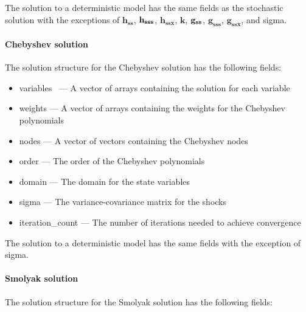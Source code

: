 \documentclass[notitlepage,11pt]{article}
\begin{document}
The solution to a deterministic model has the same fields as the stochastic
solution with the exceptions of $\mathbf{h}_{\mathbf{ss}}$, $\mathbf{h}_{%
\mathbf{sss}}$, $\mathbf{h}_{\mathbf{ssx}}$, $\mathbf{k}$, $\mathbf{g}_{%
\mathbf{ss}}$, $\mathbf{g}_{\mathbf{sss}}$, $\mathbf{g}_{\mathbf{ssx}}$, and
sigma.

\paragraph{Chebyshev solution}

The solution structure for the Chebyshev solution has the following fields:

\begin{itemize}
\item variables \ --- A vector of arrays containing the solution for each
variable

\item weights --- A vector of arrays containing the weights for the
Chebyshev polynomials

\item nodes --- A vector of vectors containing the Chebyshev nodes

\item order --- The order of the Chebyshev polynomials

\item domain --- The domain for the state variables

\item sigma --- The variance-covariance matrix for the shocks

\item iteration\_count --- The number of iterations needed to achieve
convergence
\end{itemize}

The solution to a deterministic model has the same fields with the exception
of sigma.

\paragraph{Smolyak solution}

The solution structure for the Smolyak solution has the following fields:
\end{document}
